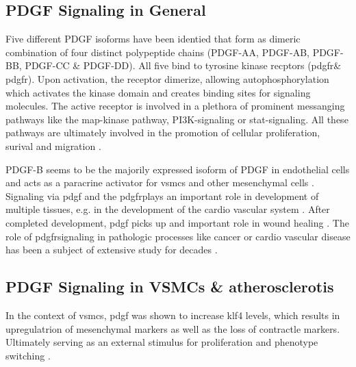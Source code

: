     \subsection{PDGF Signaling in General}
    \label{subsec:pdgf_the_cytokine}
    Five different PDGF isoforms have been identied that form as dimeric combination of four distinct polypeptide chains (PDGF-AA, PDGF-AB, PDGF-BB, PDGF-CC \& PDGF-DD). All five bind to tyrosine kinase recptors (\ac{pdgfr}\alpha \& \ac{pdgfr}\beta). Upon activation, the receptor dimerize, allowing autophosphorylation which activates the kinase domain and creates binding sites for signaling molecules. The active receptor is involved in a plethora of prominent messanging pathways like the \ac{map}-kinase pathway, \ac{PI3K}-signaling or \ac{stat}-signaling. All these pathways are ultimately involved in the promotion of cellular proliferation, surival and migration \cite{chenPlateletderivedGrowthFactors2013, heldinTargetingPDGFSignaling2013, huTargetingPlateletderivedGrowth2015}.

    PDGF-B seems to be the majorily expressed isoform of PDGF in endothelial cells \cite{andraeRolePlateletderivedGrowth2008, heldinTargetingPDGFSignaling2013} and acts as a paracrine activator for \acp{vsmc} and other mesenchymal cells \cite{heldinTargetingPDGFSignaling2013}. Signaling via \ac{pdgf} and the \ac{pdgfr}\beta plays an important role in development of multiple tissues, e.g. in the development of the cardio vascular system \cite{leveenMiceDeficientPDGF1994}. After completed development, \ac{pdgf} picks up and important role in wound healing \cite{robsonPlateletderivedGrowthFactor1992}. The role of \ac{pdgfr}\beta signaling in pathologic processes like cancer or cardio vascular disease has been a subject of extensive study for decades \cite{heldinTargetingPDGFSignaling2013, rainesPDGFCardiovascularDisease2004}.

    \subsection{PDGF Signaling in VSMCs \& atherosclerotis}
    In the context of \acp{vsmc}, \ac{pdgf} was shown to increase \ac{klf4} levels, which results in upregulatrion of mesenchymal markers as well as the loss of contractle markers. Ultimately serving as an external stimulus for proliferation and phenotype switching \cite{yapSixShadesVascular2021}.

